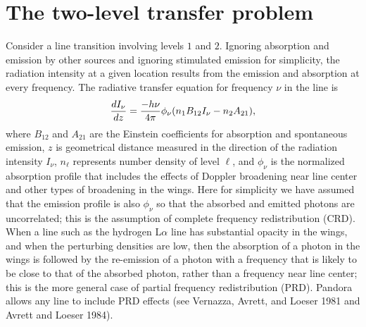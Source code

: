 \documentclass[11pt,twoside]{article}
\begin{document}
\section{The two-level transfer problem}

Consider a line transition involving levels $1$ and $2$.
Ignoring absorption and emission by other sources and
ignoring stimulated emission for simplicity, the radiation
intensity at a given location results from the emission and
absorption at every frequency. The radiative transfer
equation for frequency $\nu$ in the line is
\begin{equation}
 {d I_{\nu} \over d z} =  { -h\nu\over  4\pi} \phi_{\nu}
(n_1B_{12}I_{\nu} - n_2A_{21}),  
\end{equation}
%
where $B_{12}$ and $A_{21}$ are the Einstein coefficients for
absorption and spontaneous emission, $z$ is geometrical
distance measured in the direction of the radiation intensity
$I_{\nu}$, $n_\ell$ represents number density of level
$\ell$, and $\phi_{\nu}$ is the normalized absorption profile
that includes the effects of Doppler broadening near line
center and other types of broadening in the wings.
Here for simplicity we have assumed that the emission
profile is also $\phi_{\nu}$ so that the
absorbed and emitted photons are uncorrelated; this is the
assumption of complete frequency redistribution (CRD). When
a line such as the hydrogen L$\alpha$ line has substantial
opacity in the wings, and when the perturbing densities are
low, then the absorption of a photon in the wings is
followed by the re-emission of a photon with a frequency
that is likely to be close to that of the absorbed photon,
rather than a frequency near line center; this is the more
general case of partial frequency redistribution (PRD).
Pandora allows any line to include PRD effects (see
Vernazza, Avrett, and Loeser 1981 and Avrett and Loeser 1984).
\end{document}
